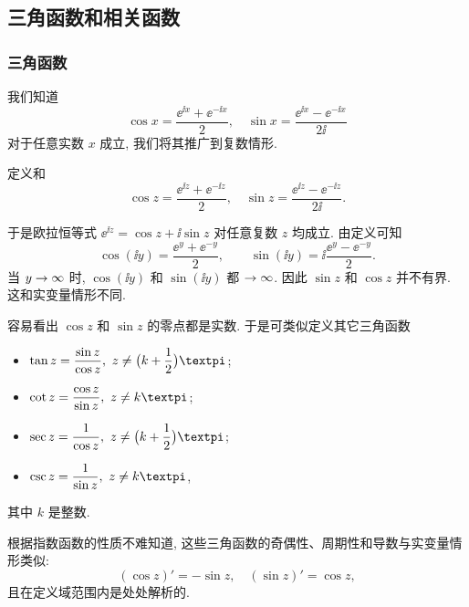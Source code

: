 \subsection{三角函数和相关函数}

\subsubsection{三角函数}

我们知道
  \[
    \cos x=\frac{\ee^{\ii x}+\ee^{-\ii x}}2,\quad
    \sin x=\frac{\ee^{\ii x}-\ee^{-\ii x}}{2\ii}
  \]
对于任意实数 $x$ 成立,
我们将其推广到复数情形.

\begin{definition}
  定义和
  \[
    \cos z=\frac{\ee^{\ii z}+\ee^{-\ii z}}2,\quad
    \sin z=\frac{\ee^{\ii z}-\ee^{-\ii z}}{2\ii}.
  \]
\end{definition}

于是欧拉恒等式 \alert{$\ee^{\ii z}=\cos z+\ii\sin z$ 对任意复数 $z$ 均成立}.
由定义可知
\[
  \cos(\ii y)=\frac{\ee^y+\ee^{-y}}2,\qquad
  \sin(\ii y)=\ii\frac{\ee^y-\ee^{-y}}2.
\]
当 $y\rightarrow\infty$ 时, $\cos(\ii y)$ 和 $\sin(\ii y)$ 都 $\rightarrow\infty$.
因此 \alert{$\sin z$ 和 $\cos z$ 并不有界}. 
这和实变量情形不同.

容易看出 $\cos z$ 和 $\sin z$ 的零点都是实数.
于是可类似定义其它三角函数
\begin{itemize}[addsep]
  \item {} $\tan z=\dfrac{\sin z}{\cos z},\ z\neq\bigl(k+\dfrac12\bigr)\cpi$;
  \item {} $\cot z=\dfrac{\cos z}{\sin z},\ z\neq k\cpi$;
  \item {} $\sec z=\dfrac{1}{\cos z},\ z\neq\bigl(k+\dfrac12\bigr)\cpi$;
  \item {} $\csc z=\dfrac{1}{\sin z},\ z\neq k\cpi$,
\end{itemize}
其中 $k$ 是整数.

根据指数函数的性质不难知道, 这些三角函数的奇偶性、周期性和导数与实变量情形类似:
  \[
    (\cos z)'=-\sin z,\quad
    (\sin z)'=\cos z,
  \]
且在定义域范围内是处处解析的.


